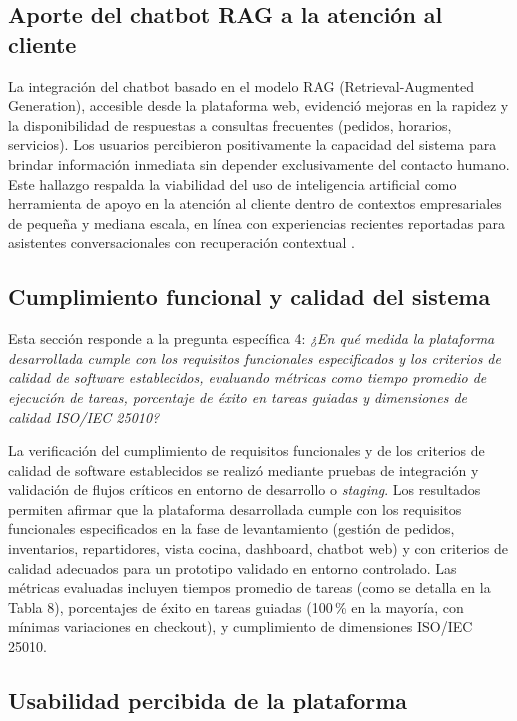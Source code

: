 \subsection{Aporte del chatbot RAG a la atención al cliente}

La integración del chatbot basado en el modelo RAG (Retrieval-Augmented Generation), accesible desde la plataforma web, evidenció mejoras en la rapidez y la disponibilidad de respuestas a consultas frecuentes (pedidos, horarios, servicios). Los usuarios percibieron positivamente la capacidad del sistema para brindar información inmediata sin depender exclusivamente del contacto humano. Este hallazgo respalda la viabilidad del uso de inteligencia artificial como herramienta de apoyo en la atención al cliente dentro de contextos empresariales de pequeña y mediana escala, en línea con experiencias recientes reportadas para asistentes conversacionales con recuperación contextual \parencite{ChenNiforatosKortuem2025}.

\subsection{Cumplimiento funcional y calidad del sistema}

Esta sección responde a la pregunta específica 4: \textit{¿En qué medida la plataforma desarrollada cumple con los requisitos funcionales especificados y los criterios de calidad de software establecidos, evaluando métricas como tiempo promedio de ejecución de tareas, porcentaje de éxito en tareas guiadas y dimensiones de calidad ISO/IEC 25010?}

La verificación del cumplimiento de requisitos funcionales y de los criterios de calidad de software establecidos se realizó mediante pruebas de integración y validación de flujos críticos en entorno de desarrollo o \textit{staging}. Los resultados permiten afirmar que la plataforma desarrollada cumple con los requisitos funcionales especificados en la fase de levantamiento (gestión de pedidos, inventarios, repartidores, vista cocina, dashboard, chatbot web) y con criterios de calidad adecuados para un prototipo validado en entorno controlado. Las métricas evaluadas incluyen tiempos promedio de tareas (como se detalla en la Tabla 8), porcentajes de éxito en tareas guiadas (100\,\% en la mayoría, con mínimas variaciones en checkout), y cumplimiento de dimensiones ISO/IEC 25010.

\subsection{Usabilidad percibida de la plataforma}

